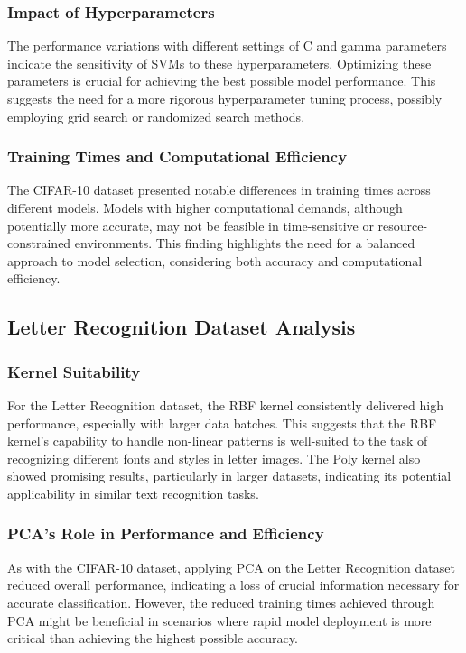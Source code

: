 \documentclass[conference]{IEEEtran}
\begin{document}
\subsubsection{Impact of Hyperparameters}
The performance variations with different settings of C and gamma parameters indicate the sensitivity of SVMs to these hyperparameters. Optimizing these parameters is crucial for achieving the best possible model performance. This suggests the need for a more rigorous hyperparameter tuning process, possibly employing grid search or randomized search methods.

\subsubsection{Training Times and Computational Efficiency}
The CIFAR-10 dataset presented notable differences in training times across different models. Models with higher computational demands, although potentially more accurate, may not be feasible in time-sensitive or resource-constrained environments. This finding highlights the need for a balanced approach to model selection, considering both accuracy and computational efficiency.

\subsection{Letter Recognition Dataset Analysis}

\subsubsection{Kernel Suitability}
For the Letter Recognition dataset, the RBF kernel consistently delivered high performance, especially with larger data batches. This suggests that the RBF kernel's capability to handle non-linear patterns is well-suited to the task of recognizing different fonts and styles in letter images. The Poly kernel also showed promising results, particularly in larger datasets, indicating its potential applicability in similar text recognition tasks.

\subsubsection{PCA's Role in Performance and Efficiency}
As with the CIFAR-10 dataset, applying PCA on the Letter Recognition dataset reduced overall performance, indicating a loss of crucial information necessary for accurate classification. However, the reduced training times achieved through PCA might be beneficial in scenarios where rapid model deployment is more critical than achieving the highest possible accuracy.
\end{document}
